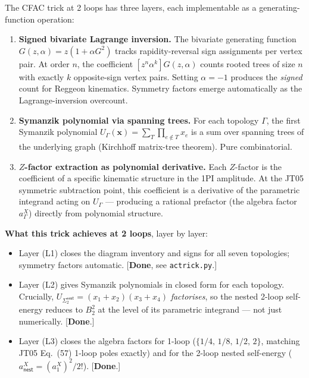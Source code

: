 \documentclass[11pt,a4paper]{article}
\theoremstyle{definition}
\theoremstyle{plain}
\begin{document}
\begin{cfacbox}
The CFAC trick at 2 loops has three layers, each implementable as a
generating-function operation:
\begin{enumerate}[leftmargin=2em]
  \item[(L1)] \textbf{Signed bivariate Lagrange inversion.}  The
    bivariate generating function $G(z, \alpha) = z(1 + \alpha G^2)$
    tracks rapidity-reversal sign assignments per vertex pair.  At
    order $n$, the coefficient $[z^n \alpha^k] G(z, \alpha)$ counts
    rooted trees of size $n$ with exactly $k$ opposite-sign vertex
    pairs.  Setting $\alpha = -1$ produces the \emph{signed} count for
    Reggeon kinematics.  Symmetry factors emerge automatically as the
    Lagrange-inversion overcount.
  \item[(L2)] \textbf{Symanzik polynomial via spanning trees.}  For
    each topology $\Gamma$, the first Symanzik polynomial
    $U_\Gamma(\boldsymbol x) = \sum_T \prod_{e \notin T} x_e$ is a
    sum over spanning trees of the underlying graph
    (Kirchhoff matrix-tree theorem).  Pure combinatorial.
  \item[(L3)] \textbf{$Z$-factor extraction as polynomial derivative.}
    Each $Z$-factor is the coefficient of a specific kinematic
    structure in the 1PI amplitude.  At the JT05 symmetric
    subtraction point, this coefficient is a derivative of the
    parametric integrand acting on $U_\Gamma$ --- producing a
    rational prefactor (the algebra factor $a^X_\Gamma$) directly
    from polynomial structure.
\end{enumerate}
\textbf{What this trick achieves at 2 loops}, layer by layer:
\begin{itemize}[leftmargin=2em]
  \item Layer (L1) closes the diagram inventory and signs for all
    seven topologies; symmetry factors automatic.
    [\textbf{Done}, see \texttt{actrick.py}.]
  \item Layer (L2) gives Symanzik polynomials in closed form for
    each topology.  Crucially, $U_{\Sigma_2^{\textsf{nest}}} =
    (x_1+x_2)(x_3+x_4)$ \emph{factorises}, so the nested 2-loop
    self-energy reduces to $B_2^2$ at the level of its parametric
    integrand --- not just numerically.  [\textbf{Done}.]
  \item Layer (L3) closes the algebra factors for 1-loop
    ($\{1/4,\,1/8,\,1/2,\,2\}$, matching JT05 Eq.~(57) 1-loop
    poles exactly) and for the 2-loop nested self-energy
    ($a^X_{\textsf{nest}} = (a^X_1)^2 / 2!$).  [\textbf{Done}.]
\end{itemize}


\end{cfacbox}
\end{document}
